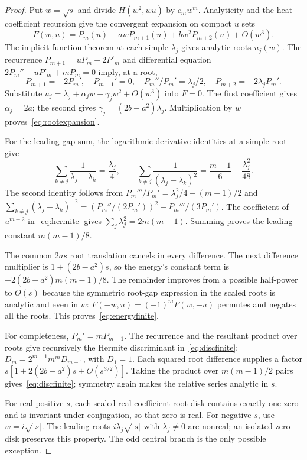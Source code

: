 \documentclass[11pt,a4paper]{article}
\theoremstyle{definition}\newtheorem{definition}[theorem]{Definition}\newtheorem{remark}[theorem]{Remark}
\begin{document}
\begin{proof}
Put $w=\sqrt{s}$ and divide $H(w^2,wu)$ by $c_mw^m$. Analyticity and the heat coefficient recursion give the convergent expansion on compact $u$ sets
\[
 F(w,u)=P_m(u)+a w P_{m+1}(u)+b w^2P_{m+2}(u)+O(w^3).
\]
The implicit function theorem at each simple $\lambda_j$ gives analytic roots $u_j(w)$. The recurrence $P_{m+1}=uP_m-2P'_m$ and differential equation $2P_m''-uP'_m+mP_m=0$ imply, at a root,
\[
 P_{m+1}=-2P_m',\quad P_{m+1}'=0,\quad
 P_m''/P_m'=\lambda_j/2,\quad P_{m+2}=-2\lambda_jP_m'.
\]
Substitute $u_j=\lambda_j+\alpha_jw+\gamma_jw^2+O(w^3)$ into $F=0$. The first coefficient gives $\alpha_j=2a$; the second gives $\gamma_j=(2b-a^2)\lambda_j$. Multiplication by $w$ proves~\eqref{eq:rootexpansion}.

For the leading gap sum, the logarithmic derivative identities at a simple root give
\[
 \sum_{k\ne j}\frac1{\lambda_j-\lambda_k}=\frac{\lambda_j}{4},\qquad
 \sum_{k\ne j}\frac1{(\lambda_j-\lambda_k)^2}
 =\frac{m-1}{6}-\frac{\lambda_j^2}{48}.
\]
The second identity follows from
$P_m'''/P_m'=\lambda_j^2/4-(m-1)/2$ and
$\sum_{k\ne j}(\lambda_j-\lambda_k)^{-2}
=(P_m''/(2P_m'))^2-P_m'''/(3P_m')$.
The coefficient of $u^{m-2}$ in~\eqref{eq:hermite} gives $\sum_j\lambda_j^2=2m(m-1)$. Summing proves the leading constant $m(m-1)/8$.

The common $2as$ root translation cancels in every difference. The next difference multiplier is $1+(2b-a^2)s$, so the energy's constant term is $-2(2b-a^2)m(m-1)/8$. The remainder improves from a possible half-power to $O(s)$ because the symmetric root-gap expression in the scaled roots is analytic and even in $w$: $F(-w,u)=(-1)^mF(w,-u)$ permutes and negates all the roots. This proves~\eqref{eq:energyfinite}.

For completeness, $P_m'=mP_{m-1}$. The recurrence and the resultant product over roots give recursively the Hermite discriminant in~\eqref{eq:discfinite}: $D_m=2^{m-1}m^mD_{m-1}$, with $D_1=1$. Each squared root difference supplies a factor $s[1+2(2b-a^2)s+O(s^{3/2})]$. Taking the product over $m(m-1)/2$ pairs gives~\eqref{eq:discfinite}; symmetry again makes the relative series analytic in $s$.

For real positive $s$, each scaled real-coefficient root disk contains exactly one zero and is invariant under conjugation, so that zero is real. For negative $s$, use $w=i\sqrt{|s|}$. The leading roots $i\lambda_j\sqrt{|s|}$ with $\lambda_j\ne0$ are nonreal; an isolated zero disk preserves this property. The odd central branch is the only possible exception.
\end{proof}
\end{document}
